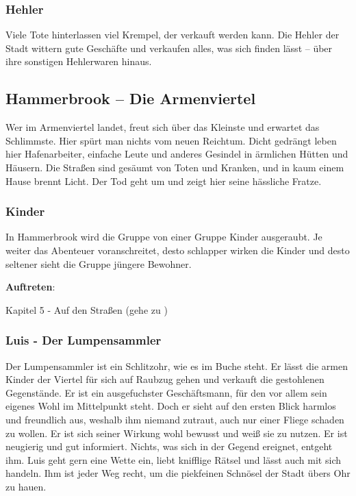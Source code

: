 \subsubsection*{Hehler}
\label{Hehler}

Viele Tote hinterlassen viel Krempel, der verkauft werden kann. Die Hehler der Stadt wittern gute Geschäfte und verkaufen alles, was sich finden lässt – über ihre sonstigen Hehlerwaren hinaus.

\subsection{Hammerbrook – Die Armenviertel}

Wer im Armenviertel landet, freut sich über das Kleinste und erwartet das Schlimmste. Hier spürt man nichts vom neuen Reichtum. Dicht gedrängt leben hier Hafenarbeiter, einfache Leute und anderes Gesindel in ärmlichen Hütten und Häusern. Die Straßen sind gesäumt von Toten und Kranken, und in kaum einem Hause brennt Licht. Der Tod geht um und zeigt hier seine hässliche Fratze.

\subsubsection*{Kinder}
\label{Kinder}

In Hammerbrook wird die Gruppe von einer Gruppe Kinder ausgeraubt. Je weiter das Abenteuer voranschreitet, desto schlapper wirken die Kinder und desto seltener sieht die Gruppe jüngere Bewohner.

\textbf{Auftreten}:

Kapitel 5 - Auf den Straßen (gehe zu \blue{\ref{strasse}})

\subsubsection*{Luis - Der Lumpensammler}
\label{Luis}

Der Lumpensammler ist ein Schlitzohr, wie es im Buche steht. Er lässt die armen Kinder der Viertel für sich auf Raubzug gehen und verkauft die gestohlenen Gegenstände. Er ist ein ausgefuchster Geschäftsmann, für den vor allem sein eigenes Wohl im Mittelpunkt steht. Doch er sieht auf den ersten Blick harmlos und freundlich aus, weshalb ihm niemand zutraut, auch nur einer Fliege schaden zu wollen. Er ist sich seiner Wirkung wohl bewusst und weiß sie zu nutzen. Er ist neugierig und gut informiert. Nichts, was sich in der Gegend ereignet, entgeht ihm. Luis geht gern eine Wette ein, liebt knifflige Rätsel und lässt auch mit sich handeln. Ihm ist jeder Weg recht, um die piekfeinen Schnösel der Stadt übers Ohr zu hauen.

